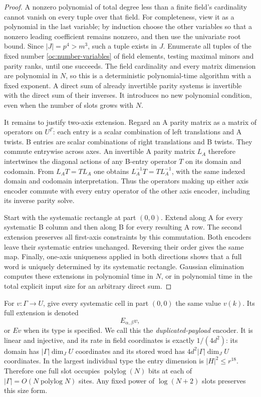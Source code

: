 \begin{proof}
A nonzero polynomial of total degree less than a finite field's
cardinality cannot vanish on every tuple over that field.  For
completeness, view it as a polynomial in the last variable; by
induction choose the other variables so that a nonzero leading
coefficient remains nonzero, and then use the univariate root bound.
Since $|J|=p^4>m^3$, such a tuple exists in $J$.  Enumerate all tuples
of the fixed number \eqref{oc:number-variables} of field elements,
testing maximal minors and parity ranks, until one succeeds.  The
field cardinality and every matrix dimension are polynomial in $N$,
so this is a deterministic polynomial-time algorithm with a fixed
exponent.  A direct sum of already invertible parity systems is
invertible with the direct sum of their inverses.  It introduces no
new polynomial condition, even when the number of slots grows with
$N$.

It remains to justify two-axis extension.  Regard an A parity matrix
as a matrix of operators on $U^\Gamma$: each entry is a scalar
combination of left translations and A twists.  B entries are scalar
combinations of right translations and B twists.  They commute
entrywise across axes.  An invertible A parity matrix $L_A$ therefore
intertwines the diagonal actions of any B-entry operator $T$ on its
domain and codomain.  From $L_AT=TL_A$ one obtains
$L_A^{-1}T=TL_A^{-1}$, with the same indexed domain and codomain
interpretation.  Thus the operators making up either axis encoder
commute with every entry operator of the other axis encoder, including
its inverse parity solve.

Start with the systematic rectangle at part $(0,0)$.  Extend along A
for every systematic B column and then along B for every resulting
A row.  The second extension preserves all first-axis constraints
by this commutation.  Both encoders leave their systematic entries
unchanged.  Reversing their order gives the same map.  Finally, one-axis
uniqueness applied in both directions shows that a full word is
uniquely determined by its systematic rectangle.  Gaussian elimination
computes these extensions in polynomial time in $N$, or in polynomial
time in the total explicit input size for an arbitrary direct sum.
\end{proof}

For $v:\Gamma\to U$, give every systematic cell in part $(0,0)$ the
same value $v(k)$.  Its full extension is denoted
\begin{equation}\label{oc:encoder}
 E_{\alpha,\beta}v,
\end{equation}
or $Ev$ when its type is specified.  We call this the
\emph{duplicated-payload} encoder.  It is linear and injective, and
its rate in field coordinates is exactly $1/(4d^2)$: its domain has
$|\Gamma|\dim_JU$ coordinates and its stored word has
$4d^2|\Gamma|\dim_JU$ coordinates.  In the largest individual type
the entry dimension is $|H|^2\le r^{18}$.  Therefore one full slot
occupies $\operatorname{polylog}(N)$ bits at each of $|\Gamma|=O(N\operatorname{polylog} N)$
sites.  Any fixed power of $\log(N+2)$ slots preserves this size form.


